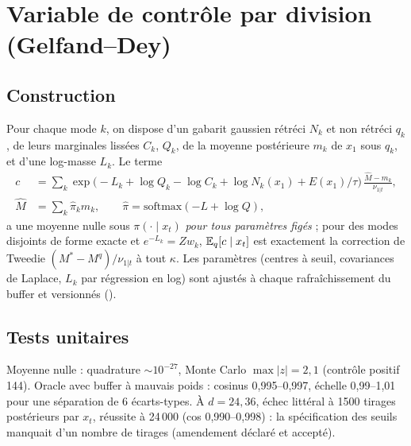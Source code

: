 \section{Variable de contrôle par division (Gelfand--Dey)}
\label{sec:division}

\subsection{Construction}
Pour chaque mode $k$, on dispose d'un gabarit gaussien rétréci $N_k$ et non rétréci $q_k$, de leurs marginales lissées $C_k$, $Q_k$, de la moyenne postérieure $m_k$ de $x_1$ sous $q_k$, et d'une log-masse $L_k$. Le terme
\[
\begin{aligned}
  c&=\sum_k \exp\!\big(-L_k+\log Q_k-\log C_k+\log N_k(x_1)+E(x_1)/\tau\big)\,\frac{\hat M-m_k}{\nu_{1|t}},\\
  \hat M&=\sum_k\hat\pi_k m_k,\qquad \hat\pi=\mathrm{softmax}(-L+\log Q),
\end{aligned}
\]
a une moyenne nulle sous $\pi(\cdot\mid x_t)$ \emph{pour tous paramètres figés} ; pour des modes disjoints de forme exacte et $e^{-L_k}=Zw_k$, $\mathbb{E}_q[c\mid x_t]$ est exactement la correction de Tweedie $(M^*-M^q)/\nu_{1|t}$ à tout $\kappa$. Les paramètres (centres à seuil, covariances de Laplace, $L_k$ par régression en log) sont ajustés à chaque rafraîchissement du buffer et versionnés ().

\subsection{Tests unitaires}
Moyenne nulle : quadrature $\sim10^{-27}$, Monte Carlo $\max|z|=2{,}1$ (contrôle positif 144). Oracle avec buffer à mauvais poids : cosinus 0,995--0,997, échelle 0,99--1,01 pour une séparation de 6 écarts-types. À $d=24,36$, échec littéral à 1500 tirages postérieurs par $x_t$, réussite à 24\,000 (cos 0,990--0,998) : la spécification des seuils manquait d'un nombre de tirages (amendement déclaré et accepté).

